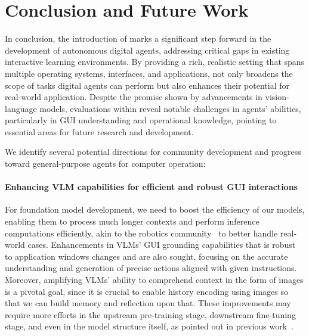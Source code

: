 \section{Conclusion and Future Work}\label{sec:conclusion}

In conclusion, the introduction of \ours marks a significant step forward in the development of autonomous digital agents, addressing critical gaps in existing interactive learning environments. 
By providing a rich, realistic setting that spans multiple operating systems, interfaces, and applications, \ours not only broadens the scope of tasks digital agents can perform but also enhances their potential for real-world application. 
Despite the promise shown by advancements in vision-language models, evaluations within \ours reveal notable challenges in agents' abilities, particularly in GUI understanding and operational knowledge, pointing to essential areas for future research and development.

We identify several potential directions for community development and progress toward general-purpose agents for computer operation:
\paragraph{Enhancing VLM capabilities for efficient and robust GUI interactions}
For foundation model development, we need to boost the efficiency of our models, enabling them to process much longer contexts and perform inference computations efficiently, akin to the robotics community~\citep{brohan2022rt, brohan2023rt} to better handle real-world cases.
Enhancements in VLMs' GUI grounding capabilities that is robust to application windows changes and  are also sought, focusing on the accurate understanding and generation of precise actions aligned with given instructions. 
Moreover, amplifying VLMs' ability to comprehend context in the form of images is a pivotal goal, since it is crucial to enable history encoding using images so that we can build memory and reflection upon that.
These improvements may require more efforts in the upstream pre-training stage, downstream fine-tuning stage, and even in the model structure itself, as pointed out in previous work~\citep{deng2023mind2web, hong2023cogagent, lu2024weblinx}.

